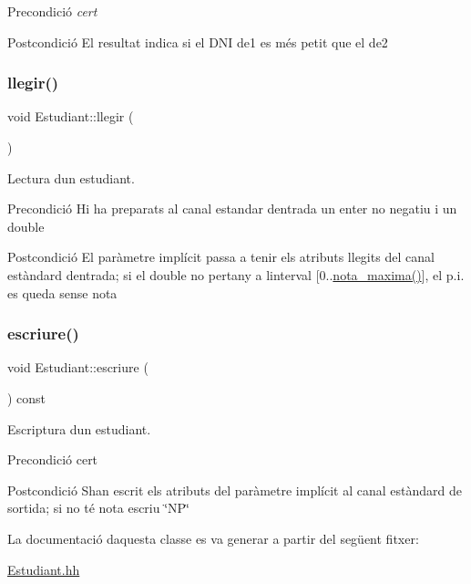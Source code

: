 \begin{DoxyPrecond}{Precondició}
{\itshape cert} 
\end{DoxyPrecond}
\begin{DoxyPostcond}{Postcondició}
El resultat indica si el D\+NI d\textquotesingle{}e1 es més petit que el d\textquotesingle{}e2 
\end{DoxyPostcond}
\mbox{\label{class_estudiant_af5c4883975828647dfb5ffc6735740e6}} 
\subsubsection{\texorpdfstring{llegir()}{llegir()}}
{\footnotesize\ttfamily void Estudiant\+::llegir (\begin{DoxyParamCaption}{ }\end{DoxyParamCaption})}



Lectura d\textquotesingle{}un estudiant. 

\begin{DoxyPrecond}{Precondició}
Hi ha preparats al canal estandar d\textquotesingle{}entrada un enter no negatiu i un double 
\end{DoxyPrecond}
\begin{DoxyPostcond}{Postcondició}
El paràmetre implícit passa a tenir els atributs llegits del canal estàndard d\textquotesingle{}entrada; si el double no pertany a l\textquotesingle{}interval \mbox{[}0..\hyperlink{class_estudiant_a5df5eed414c87a2a1c2efa4194633afd}{nota\+\_\+maxima()}\mbox{]}, el p.\+i. es queda sense nota 
\end{DoxyPostcond}
\mbox{\label{class_estudiant_aa9a1736c5b133c65d0e9ba299bb41de5}} 
\subsubsection{\texorpdfstring{escriure()}{escriure()}}
{\footnotesize\ttfamily void Estudiant\+::escriure (\begin{DoxyParamCaption}{ }\end{DoxyParamCaption}) const}



Escriptura d\textquotesingle{}un estudiant. 

\begin{DoxyPrecond}{Precondició}
cert 
\end{DoxyPrecond}
\begin{DoxyPostcond}{Postcondició}
S\textquotesingle{}han escrit els atributs del paràmetre implícit al canal estàndard de sortida; si no té nota escriu \char`\"{}\+N\+P\char`\"{} 
\end{DoxyPostcond}


La documentació d\textquotesingle{}aquesta classe es va generar a partir del següent fitxer\+:\begin{DoxyCompactItemize}
\item 
\hyperlink{_estudiant_8hh}{Estudiant.\+hh}\end{DoxyCompactItemize}
